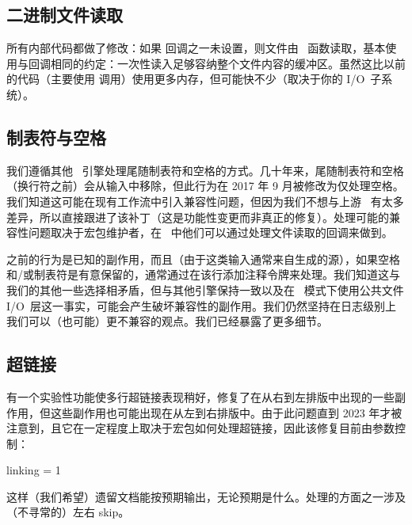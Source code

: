 \subsection{二进制文件读取}


所有内部代码都做了修改：如果  回调之一未设置，则文件由 \CCODE\ 函数读取，基本使用与回调相同的约定：一次性读入足够容纳整个文件内容的缓冲区。虽然这比以前的代码（主要使用  调用）使用更多内存，但可能快不少（取决于你的 I/O\ 子系统）。

\subsection{制表符与空格}


我们遵循其他 \TEX\ 引擎处理尾随制表符和空格的方式。几十年来，尾随制表符和空格（换行符之前）会从输入中移除，但此行为在 2017 年 9 月被修改为仅处理空格。我们知道这可能在现有工作流中引入兼容性问题，但因为我们不想与上游 \TEXLIVE\ 有太多差异，所以直接跟进了该补丁（这是功能性变更而非真正的修复）。处理可能的兼容性问题取决于宏包维护者，在 \LUATEX\ 中他们可以通过处理文件读取的回调来做到。

之前的行为是已知的副作用，而且（由于这类输入通常来自生成的源），如果空格和/或制表符是有意保留的，通常通过在该行添加注释令牌来处理。我们知道这与我们的其他一些选择相矛盾，但与其他引擎保持一致以及在 \KPSE\ 模式下使用公共文件 I/O\ 层这一事实，可能会产生破坏兼容性的副作用。我们仍然坚持在日志级别上我们可以（也可能）更不兼容的观点。我们已经暴露了更多细节。

\subsection{超链接}


有一个实验性功能使多行超链接表现稍好，修复了在从右到左排版中出现的一些副作用，但这些副作用也可能出现在从左到右排版中。由于此问题直到 2023 年才被注意到，且它在一定程度上取决于宏包如何处理超链接，因此该修复目前由参数控制：

\begin{typing}
\pdfvariable linking = 1
\end{typing}

这样（我们希望）遗留文档能按预期输出，无论预期是什么。处理的方面之一涉及（不寻常的）左右 skip。

